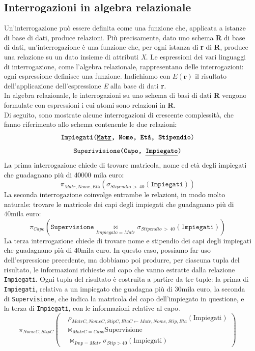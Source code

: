 \documentclass[12pt]{report}
\begin{document}
 	\subsection{Interrogazioni in algebra relazionale}
 	Un'interrogazione può essere definita come una funzione che, applicata a istanze di base di dati, produce relazioni. Più precisamente, dato uno schema \textbf{R} di base di dati, un'interrogazione è una funzione che, per ogni istanza di \textbf{r} di \textbf{R}, produce una relazione su un dato insieme di attributi \textit{X}.  Le espressioni dei vari linguaggi di interrogazione, come l'algebra relazionale, rappresentano delle interrogazioni: ogni espressione definisce una funzione. Indichiamo con $E(\mathbf{r})$ il risultato dell'applicazione dell'espressione \textit{E} alla base di dati \textbf{r}. \\
 	In algebra relazionale, le interrogazioni su uno schema di basi di dati \textbf{R} vengono formulate con espressioni i cui atomi sono relazioni in \textbf{R}. \\
 	Di seguito, sono mostrate alcune interrogazioni di crescente complessità, che fanno riferimento allo schema contenente le due relazioni:
 	\[
 	\texttt{Impiegati(\textbf{\underline{Matr}, Nome, Età, Stipendio})}
 	\]
 	\[
 	\texttt{Superivisione(\textbf{Capo, \underline{Impiegato}})}
 	\]
 	La prima interrogazione chiede di trovare matricola, nome ed età degli impiegati che guadagnano più di 40000 mila euro:
 	\[
 	\pi_{Matr, Nome, Età}(\sigma_{Stipendio\ >\ 40}(\texttt{Impiegati}))
 	\]
 	La seconda interrogazione coinvolge entrambe le relazioni, in modo molto naturale: trovare le matricole dei capi degli impiegati che guadagnano più di 40mila euro:
 	\[
 	\pi_{Capo}(\texttt{Supervisione} \underset{Impiegato = Matr}{\bowtie} \sigma_{Stipendio\ >\ 40}(\texttt{Impiegati}))
 	\]
 	La terza interrogazione chiede di trovare nome e stipendio dei capi degli impiegati che guadagnano più di 40mila euro. In questo caso, possiamo far uso dell'espressione precedente, ma dobbiamo poi produrre, per ciascuna tupla del risultato, le informazioni richieste sul capo che vanno estratte dalla relazione \texttt{Impiegati}. Ogni tupla del risultato è costruita a partire da tre tuple: la prima di \texttt{Impiegati}, relativa a un impiegato che guadagna più di 30mila euro, la seconda di \texttt{Supervisione}, che indica la matricola del capo dell'impiegato in questione, e la terza di \texttt{Impiegati}, con le informazioni relative al capo.
 	\[
 	\pi_{NomeC, StipC} \left(
 	\begin{aligned}
 		& \rho_{MatrC, NomeC, StipC, EtaC \leftarrow Matr, Nome, Stip, Eta}(\text{Impiegati}) \\
 		& \bowtie_{MatrC = Capo} \text{Supervisione} \\
 		& \bowtie_{Imp = Matr} \sigma_{Stip > 40}(\text{Impiegati})
 	\end{aligned}
 	\right)
 	\]
\end{document}
